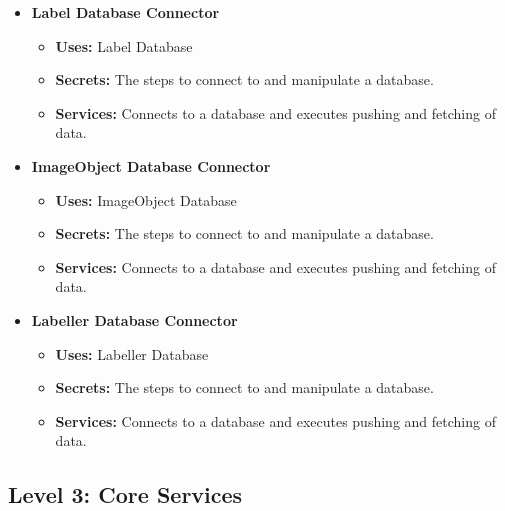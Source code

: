 \documentclass[12pt, titlepage]{article}
\begin{document}
\begin{itemize}
    \item \textbf{Label Database Connector}
    \begin{itemize}
        \item \textbf{Uses:} Label Database
        \item \textbf{Secrets:} The steps to connect to and manipulate a database.
        \item \textbf{Services:} Connects to a database and executes pushing and fetching of data.
    \end{itemize}
    \item \textbf{ImageObject Database Connector}
    \begin{itemize}
        \item \textbf{Uses:} ImageObject Database
        \item \textbf{Secrets:} The steps to connect to and manipulate a database.
        \item \textbf{Services:} Connects to a database and executes pushing and fetching of data.
    \end{itemize}
    \item \textbf{Labeller Database Connector}
    \begin{itemize}
        \item \textbf{Uses:} Labeller Database
        \item \textbf{Secrets:} The steps to connect to and manipulate a database.
        \item \textbf{Services:} Connects to a database and executes pushing and fetching of data.
    \end{itemize}
\end{itemize}

\subsection*{Level 3: Core Services}
\end{document}
